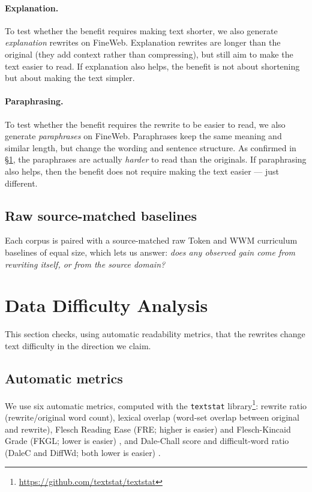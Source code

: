 \documentclass[11pt]{article}
\begin{document}
\paragraph{Explanation.} To test whether the benefit requires making text shorter, we also generate \emph{explanation} rewrites on FineWeb. Explanation rewrites are longer than the original (they add context rather than compressing), but still aim to make the text easier to read. If explanation also helps, the benefit is not about shortening but about making the text simpler.

\paragraph{Paraphrasing.} To test whether the benefit requires the rewrite to be easier to read, we also generate \emph{paraphrases} on FineWeb. Paraphrases keep the same meaning and similar length, but change the wording and sentence structure. As confirmed in \S\ref{sec:difficulty-analysis}, the paraphrases are actually \emph{harder} to read than the originals. If paraphrasing also helps, then the benefit does not require making the text easier --- just different.

\subsection{Raw source-matched baselines}
\label{sec:paraneg-data}

Each corpus is paired with a source-matched raw Token and WWM curriculum baselines of equal size, which lets us answer: \emph{does any observed gain come from rewriting itself, or from the source domain?}

\section{Data Difficulty Analysis}
\label{sec:difficulty-analysis}

This section checks, using automatic readability metrics, that the rewrites change text difficulty in the direction we claim.

\subsection{Automatic metrics}

We use six automatic metrics, computed with the \texttt{textstat} library\footnote{\url{https://github.com/textstat/textstat}}: rewrite ratio (rewrite/original word count), lexical overlap (word-set overlap between original and rewrite), Flesch Reading Ease (FRE; higher is easier) and Flesch-Kincaid Grade (FKGL; lower is easier) \citep{kincaid1975flesch}, and Dale-Chall score and difficult-word ratio (DaleC and DiffWd; both lower is easier) \citep{chall1995dalechall}.
\end{document}
